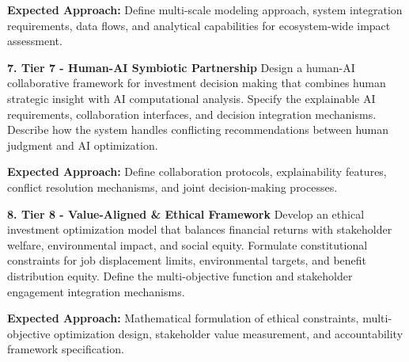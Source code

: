 \documentclass{article}
\begin{document}
\textbf{Expected Approach:} Define multi-scale modeling approach, system integration requirements, data flows, and analytical capabilities for ecosystem-wide impact assessment.

\textbf{7. Tier 7 - Human-AI Symbiotic Partnership}
Design a human-AI collaborative framework for investment decision making that combines human strategic insight with AI computational analysis. Specify the explainable AI requirements, collaboration interfaces, and decision integration mechanisms. Describe how the system handles conflicting recommendations between human judgment and AI optimization.

\textbf{Expected Approach:} Define collaboration protocols, explainability features, conflict resolution mechanisms, and joint decision-making processes.

\textbf{8. Tier 8 - Value-Aligned \& Ethical Framework}
Develop an ethical investment optimization model that balances financial returns with stakeholder welfare, environmental impact, and social equity. Formulate constitutional constraints for job displacement limits, environmental targets, and benefit distribution equity. Define the multi-objective function and stakeholder engagement integration mechanisms.

\textbf{Expected Approach:} Mathematical formulation of ethical constraints, multi-objective optimization design, stakeholder value measurement, and accountability framework specification.
\end{document}
